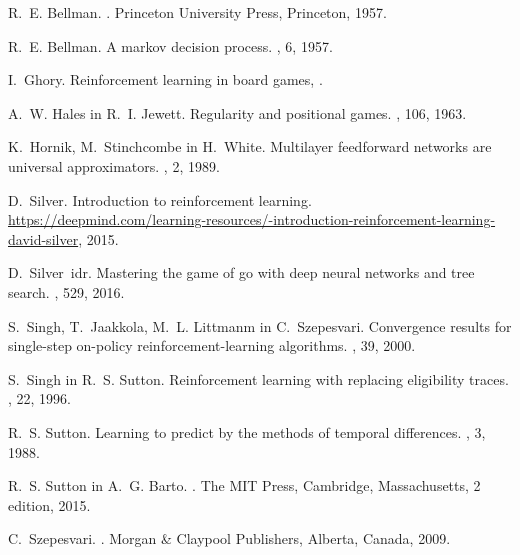 \documentclass[12pt,a4paper]{amsart}
\theoremstyle{definition} %
\theoremstyle{plain} %
\begin{document}
\begin{thebibliography}{10}

    R.~E. Bellman.
    .
    \newblock Princeton University Press, Princeton, 1957.
    
    R.~E. Bellman.
    \newblock A markov decision process.
    , 6, 1957.
    
    I.~Ghory.
    \newblock Reinforcement learning in board games,
    .
    
    A.~W. Hales in R.~I. Jewett.
    \newblock Regularity and positional games.
    , 106, 1963.
    
    K.~Hornik, M.~Stinchcombe in H.~White.
    \newblock Multilayer feedforward networks are universal approximators.
    , 2, 1989.
    
    D.~Silver.
    \newblock Introduction to reinforcement learning.
    \newblock
      \url{https://deepmind.com/learning-resources/-introduction-reinforcement-learning-david-silver},
      2015.
    
    D.~Silver~idr.
    \newblock Mastering the game of go with deep neural networks and tree search.
    , 529, 2016.
    
    S.~Singh, T.~Jaakkola, M.~L. Littmanm in C.~Szepesvari.
    \newblock Convergence results for single-step on-policy reinforcement-learning
      algorithms.
    , 39, 2000.
    
    S.~Singh in R.~S. Sutton.
    \newblock Reinforcement learning with replacing eligibility traces.
    , 22, 1996.
    
    R.~S. Sutton.
    \newblock Learning to predict by the methods of temporal differences.
    , 3, 1988.
    
    R.~S. Sutton in A.~G. Barto.
    .
    \newblock The MIT Press, Cambridge, Massachusetts, 2 edition, 2015.
    
    C.~Szepesvari.
    .
    \newblock Morgan \& Claypool Publishers, Alberta, Canada, 2009.
    
    \end{thebibliography}
\end{document}
